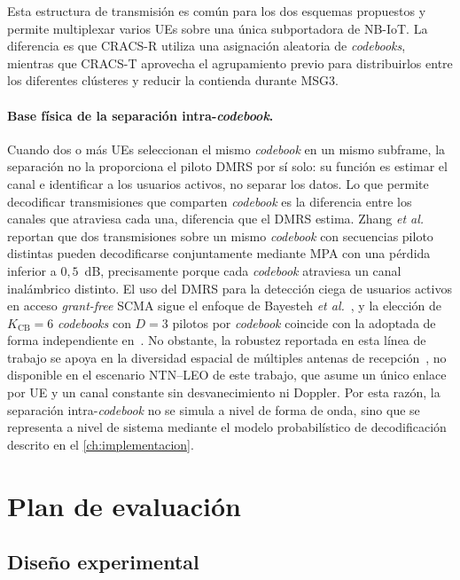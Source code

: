 Esta estructura de transmisión es común para los dos esquemas propuestos y permite multiplexar varios UEs sobre una única subportadora de NB-IoT. La diferencia es que CRACS-R utiliza una asignación aleatoria de \textit{codebooks}, mientras que CRACS-T aprovecha el agrupamiento previo para distribuirlos entre los diferentes clústeres y reducir la contienda durante MSG3.

\paragraph{Base física de la separación intra-\textit{codebook}.} Cuando dos o más UEs seleccionan el mismo \textit{codebook} en un mismo subframe, la separación no la proporciona el piloto DMRS por sí solo: su función es estimar el canal e identificar a los usuarios activos, no separar los datos. Lo que permite decodificar transmisiones que comparten \textit{codebook} es la diferencia entre los canales que atraviesa cada una, diferencia que el DMRS estima. Zhang \textit{et al.}~\cite{ref40} reportan que dos transmisiones sobre un mismo \textit{codebook} con secuencias piloto distintas pueden decodificarse conjuntamente mediante MPA con una pérdida inferior a $0{,}5$~dB, precisamente porque cada \textit{codebook} atraviesa un canal inalámbrico distinto. El uso del DMRS para la detección ciega de usuarios activos en acceso \textit{grant-free} SCMA sigue el enfoque de Bayesteh \textit{et al.}~\cite{ref42}, y la elección de $K_{\text{CB}}=6$ \textit{codebooks} con $D=3$ pilotos por \textit{codebook} coincide con la adoptada de forma independiente en~\cite{ref41}. No obstante, la robustez reportada en esta línea de trabajo se apoya en la diversidad espacial de múltiples antenas de recepción~\cite{ref43}, no disponible en el escenario NTN--LEO de este trabajo, que asume un único enlace por UE y un canal constante sin desvanecimiento ni Doppler. Por esta razón, la separación intra-\textit{codebook} no se simula a nivel de forma de onda, sino que se representa a nivel de sistema mediante el modelo probabilístico de decodificación descrito en el \cref{ch:implementacion}.

\section{Plan de evaluación}
\label{sec:metodologia}


\subsection{Diseño experimental}
\label{sec:dis_simulacion}

